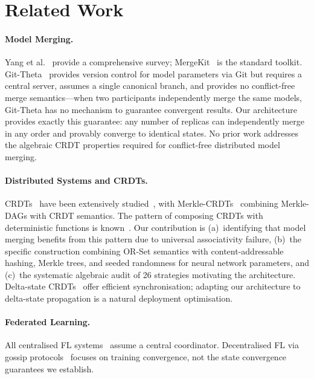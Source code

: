 \documentclass[10pt,letterpaper]{article}
\begin{document}
\section{Related Work}

\paragraph{Model Merging.}
Yang et al.~\cite{yang2024survey} provide a comprehensive survey; MergeKit~\cite{goddard2024mergekit} is the standard toolkit.
Git-Theta~\cite{kandpal2023gittheta} provides version control for model parameters via Git but requires a central server, assumes a single canonical branch, and provides no conflict-free merge semantics---when two participants independently merge the same models, Git-Theta has no mechanism to guarantee convergent results.
Our architecture provides exactly this guarantee: any number of replicas can independently merge in any order and provably converge to identical states.
No prior work addresses the algebraic CRDT properties required for conflict-free distributed model merging.

\paragraph{Distributed Systems and CRDTs.}
CRDTs~\cite{shapiro2011conflict, shapiro2011comprehensive} have been extensively studied~\cite{preguica2018conflict, kleppmann2017conflict}, with Merkle-CRDTs~\cite{sanjuan2020merkle} combining Merkle-DAGs with CRDT semantics.
The pattern of composing CRDTs with deterministic functions is known~\cite{shapiro2011comprehensive}.
Our contribution is (a)~identifying that model merging benefits from this pattern due to universal associativity failure, (b)~the specific construction combining OR-Set semantics with content-addressable hashing, Merkle trees, and seeded randomness for neural network parameters, and (c)~the systematic algebraic audit of 26 strategies motivating the architecture.
Delta-state CRDTs~\cite{almeida2018delta} offer efficient synchronisation; adapting our architecture to delta-state propagation is a natural deployment optimisation.

\paragraph{Federated Learning.}
All centralised FL systems~\cite{mcmahan2017communication, kairouz2021advances, li2020fedprox, bonawitz2019towards} assume a central coordinator.
Decentralised FL via gossip protocols~\cite{lian2017decentralized, koloskova2019decentralized} focuses on training convergence, not the state convergence guarantees we establish.
\end{document}
